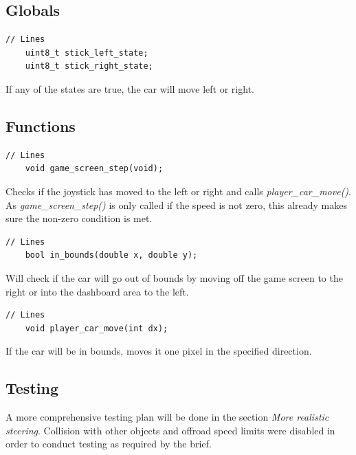 \documentclass{article}
\begin{document}
\subsection*{Globals}
\begin{lstlisting}[style=CStyle]
	// Lines
	uint8_t stick_left_state;
	uint8_t stick_right_state;
\end{lstlisting}
If any of the states are true, the car will move left or right. 
\newline

\subsection*{Functions}
\begin{lstlisting}[style=CStyle]
	// Lines
	void game_screen_step(void);
\end{lstlisting}
Checks if the joystick has moved to the left or right and calls \emph{player\_car\_move()}. As \emph{game\_screen\_step()} is only called if the speed is not zero, this already makes sure the non-zero condition is met.
\begin{lstlisting}[style=CStyle]
	// Lines
	bool in_bounds(double x, double y);
\end{lstlisting}
Will check if the car will go out of bounds by moving off the game screen to the right or into the dashboard area to the left.
\begin{lstlisting}[style=CStyle]
	// Lines
	void player_car_move(int dx);
\end{lstlisting}
If the car will be in bounds, moves it one pixel in the specified direction.
\newline

\subsection*{Testing}
A more comprehensive testing plan will be done in the section \emph{More realistic steering}. Collision with other objects and offroad speed limits were disabled in order to conduct testing as required by the brief.
\end{document}
